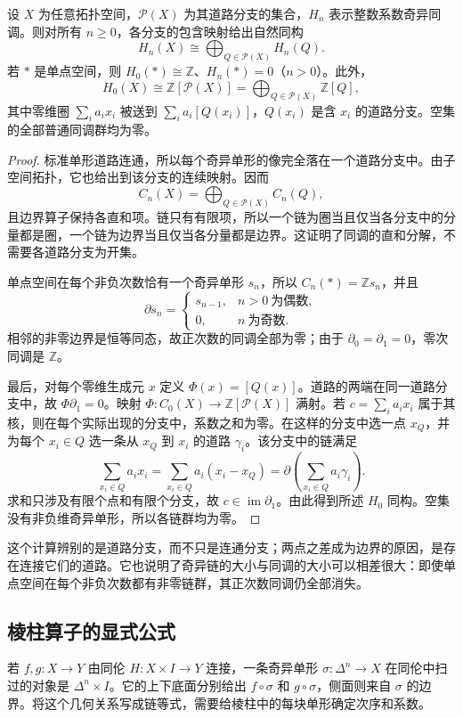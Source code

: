 \begin{proposition}\label{g2:prop:homology-point-components}
	设 \(X\) 为任意拓扑空间，\(\mathcal P(X)\) 为其道路分支的集合，\(H_n\) 表示整数系数奇异同调。则对所有 \(n\ge0\)，各分支的包含映射给出自然同构
	\[
		H_n(X)\cong\bigoplus_{Q\in\mathcal P(X)}H_n(Q).
	\]
	若 \(*\) 是单点空间，则 \(H_0(*)\cong\mathbb Z\)、\(H_n(*)=0\)（\(n>0\)）。此外，
	\[
		H_0(X)\cong\mathbb Z[\mathcal P(X)]
		=\bigoplus_{Q\in\mathcal P(X)}\mathbb Z[Q],
	\]
	其中零维圈 \(\sum_i a_i x_i\) 被送到 \(\sum_i a_i[Q(x_i)]\)，\(Q(x_i)\) 是含 \(x_i\) 的道路分支。空集的全部普通同调群均为零。
\end{proposition}
\begin{proof}
	标准单形道路连通，所以每个奇异单形的像完全落在一个道路分支中。由子空间拓扑，它也给出到该分支的连续映射。因而
	\[
		C_n(X)=\bigoplus_{Q\in\mathcal P(X)}C_n(Q),
	\]
	且边界算子保持各直和项。链只有有限项，所以一个链为圈当且仅当各分支中的分量都是圈，一个链为边界当且仅当各分量都是边界。这证明了同调的直和分解，不需要各道路分支为开集。

	单点空间在每个非负次数恰有一个奇异单形 \(s_n\)，所以 \(C_n(*)=\mathbb Zs_n\)，并且
	\[
		\partial s_n=
		\begin{cases}
			s_{n-1},&n>0\ \text{为偶数},\\
			0,&n\ \text{为奇数}.
		\end{cases}
	\]
	相邻的非零边界是恒等同态，故正次数的同调全部为零；由于 \(\partial_0=\partial_1=0\)，零次同调是 \(\mathbb Z\)。

	最后，对每个零维生成元 \(x\) 定义 \(\Phi(x)=[Q(x)]\)。道路的两端在同一道路分支中，故 \(\Phi\partial_1=0\)。映射 \(\Phi:C_0(X)\to\mathbb Z[\mathcal P(X)]\) 满射。若 \(c=\sum_i a_ix_i\) 属于其核，则在每个实际出现的分支中，系数之和为零。在这样的分支中选一点 \(x_Q\)，并为每个 \(x_i\in Q\) 选一条从 \(x_Q\) 到 \(x_i\) 的道路 \(\gamma_i\)。该分支中的链满足
	\[
		\sum_{x_i\in Q}a_ix_i
		=\sum_{x_i\in Q}a_i(x_i-x_Q)
		=\partial\left(\sum_{x_i\in Q}a_i\gamma_i\right).
	\]
	求和只涉及有限个点和有限个分支，故 \(c\in\operatorname{im}\partial_1\)。由此得到所述 \(H_0\) 同构。空集没有非负维奇异单形，所以各链群均为零。
\end{proof}

这个计算辨别的是道路分支，而不只是连通分支；两点之差成为边界的原因，是存在连接它们的道路。它也说明了奇异链的大小与同调的大小可以相差很大：即使单点空间在每个非负次数都有非零链群，其正次数同调仍全部消失。

\subsection{棱柱算子的显式公式}
\label{g2:subsec:0202:02}
若 \(f,g:X\to Y\) 由同伦 \(H:X\times I\to Y\) 连接，一条奇异单形 \(\sigma:\Delta^n\to X\) 在同伦中扫过的对象是 \(\Delta^n\times I\)。它的上下底面分别给出 \(f\circ\sigma\) 和 \(g\circ\sigma\)，侧面则来自 \(\sigma\) 的边界。将这个几何关系写成链等式，需要给棱柱中的每块单形确定次序和系数。

